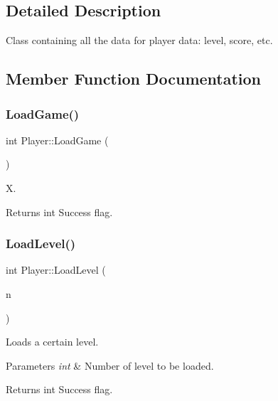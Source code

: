 \subsection{Detailed Description}
Class containing all the data for player data\+: level, score, etc. 

\subsection{Member Function Documentation}
\mbox{\label{class_player_a7d6d5ae271d5a9897f9e2aae65184dac}} 
\subsubsection{\texorpdfstring{Load\+Game()}{LoadGame()}}
{\footnotesize\ttfamily int Player\+::\+Load\+Game (\begin{DoxyParamCaption}{ }\end{DoxyParamCaption})}



X. 

\begin{DoxyReturn}{Returns}
int Success flag. 
\end{DoxyReturn}
\mbox{\label{class_player_ad0ad39f2def9706f640756bfa18325b9}} 
\subsubsection{\texorpdfstring{Load\+Level()}{LoadLevel()}}
{\footnotesize\ttfamily int Player\+::\+Load\+Level (\begin{DoxyParamCaption}\item[{int}]{n }\end{DoxyParamCaption})}



Loads a certain level. 


\begin{DoxyParams}{Parameters}
{\em int} & Number of level to be loaded.\\
\hline
\end{DoxyParams}
\begin{DoxyReturn}{Returns}
int Success flag. 
\end{DoxyReturn}
\mbox{\label{class_player_a39b5ad5853752cfce82e54b67c2e57e7}} 

